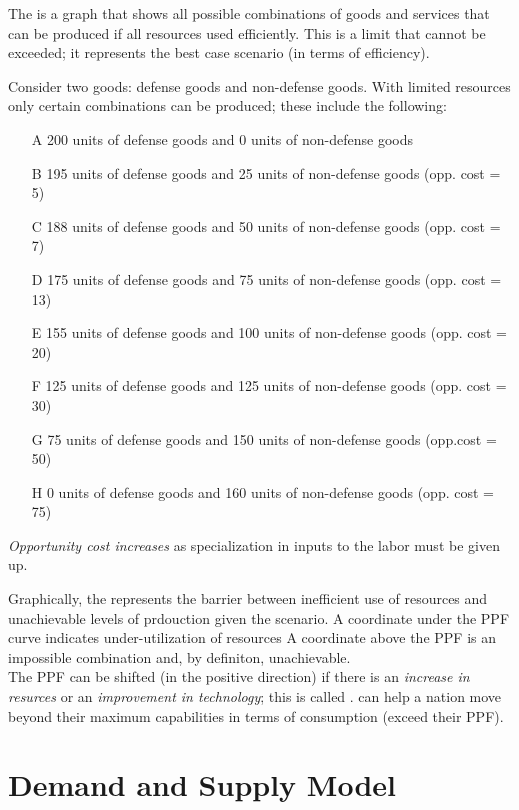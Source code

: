 \documentclass{article}
\begin{document}
The  is a graph that shows all possible combinations of goods and services that can be produced if all resources used efficiently. This is a limit that cannot be exceeded; it represents the best case scenario (in terms of efficiency). 

\begin{example}
Consider two goods: defense goods and non-defense goods. With limited resources only certain combinations can be produced; these include the following:
  \begin{itemize}
    \item[A] 200 units of defense goods and 0 units of non-defense goods
    \item[B] 195 units of defense goods and 25 units of non-defense goods (opp. cost = 5)
    \item[C] 188 units of defense goods and 50 units of non-defense goods (opp. cost = 7) 
    \item[D] 175 units of defense goods and 75 units of non-defense goods (opp. cost = 13)
    \item[E] 155 units of defense goods and 100 units of non-defense goods (opp. cost = 20)
    \item[F] 125 units of defense goods and 125 units of non-defense goods (opp. cost = 30)
    \item[G] 75 units of defense goods and 150 units of non-defense goods (opp.cost = 50)
    \item[H] 0 units of defense goods and 160 units of non-defense goods (opp. cost = 75)
  \end{itemize}
\emph{Opportunity cost increases} as specialization in inputs to the labor must be given up. 
\end{example}

Graphically, the  represents the barrier between inefficient use of resources and unachievable levels of prdouction given the scenario. A coordinate under the PPF curve indicates under-utilization of resources A coordinate above the PPF is an impossible combination and, by definiton, unachievable. \\

The PPF can be shifted (in the positive direction) if there is an \emph{increase in resurces} or an \emph{improvement in technology}; this is called .  can help a nation move beyond their maximum capabilities in terms of consumption (exceed their PPF). 

\section{Demand and Supply Model}
\end{document}
